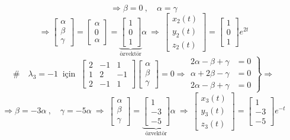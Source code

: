 \documentclass[11pt,a4paper]{article}
\begin{document}
\begin{cozum}
\[\]
\[
\Rightarrow \beta = 0 \ , \quad \alpha = \gamma
\]
\[
\Rightarrow \begin{bmatrix} \alpha \\ \beta \\ \gamma \end{bmatrix} = \begin{bmatrix} \alpha \\ 0 \\ \alpha \end{bmatrix} = \underbrace{\begin{bmatrix} 1 \\ 0 \\ 1 \end{bmatrix}}_{\text{özvektör}} \alpha \ \Rightarrow \ \begin{bmatrix} x_2(t) \\ y_2(t) \\ z_2(t) \end{bmatrix} = \begin{bmatrix} 1 \\ 0 \\ 1 \end{bmatrix} e^{2t}
\]
\[
\# \quad \lambda_3 = -1 \ \text{ için } \ \begin{bmatrix} 2 & -1 & 1 \\ 1 & 2 & -1 \\ 2 & -1 & 1 \end{bmatrix}\begin{bmatrix} \alpha \\ \beta \\ \gamma \end{bmatrix} = 0 \Rightarrow \left.\begin{aligned} 2\alpha - \beta + \gamma &= 0 \\ \alpha + 2\beta - \gamma &= 0 \\ 2\alpha - \beta + \gamma &= 0 \end{aligned}\right\} \Rightarrow
\]
\[
\Rightarrow \beta = -3\alpha \ , \quad \gamma = -5\alpha \ \Rightarrow \ \begin{bmatrix} \alpha \\ \beta \\ \gamma \end{bmatrix} = \underbrace{\begin{bmatrix} 1 \\ -3 \\ -5 \end{bmatrix}}_{\text{özvektör}} \alpha \ \Rightarrow \ \begin{bmatrix} x_3(t) \\ y_3(t) \\ z_3(t) \end{bmatrix} = \begin{bmatrix} 1 \\ -3 \\ -5 \end{bmatrix} e^{-t}
\]


\end{cozum}
\end{document}
